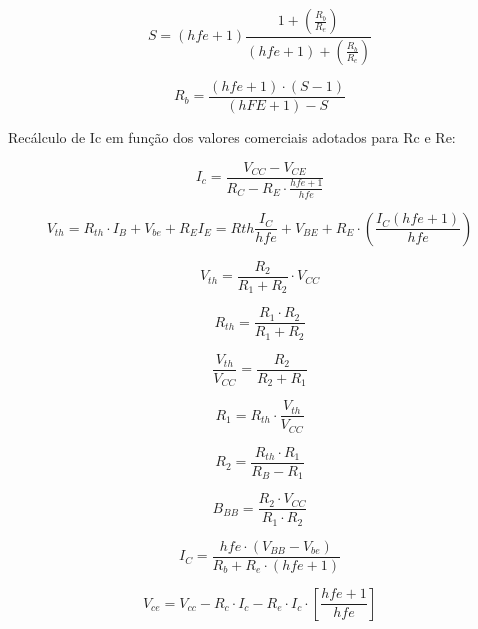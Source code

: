 \documentclass[openright]{normas-utf-tex} %
\begin{document}
\begin{equation}
S = \left(hfe + 1 \right)\frac{1 + \left( \frac{R_b}{R_e} \right)}{\left(hfe + 1 \right) + \left(\frac{R_b}{R_e} \right)}
\end{equation}

\begin{equation}
R_b = \frac{ \left(hfe + 1 \right) \cdot \left( S - 1 \right)}
{(hFE + 1 ) - S}
\end{equation}

Recálculo de Ic em função dos valores comerciais adotados para Rc e Re:

\begin{equation}
I_c = \frac{V_{CC} - V_{CE}}{R_C-R_E \cdot \frac{hfe+1}{hfe}}
\end{equation}

\begin{equation}
V_{th} = R_{th} \cdot I_B + V_{be} + R_E I_E = R{th} \frac{I_C}{hfe} + V_{BE} + R_E \cdot\left(\frac{I_C\left(hfe+1\right)}{hfe}\right)
\end{equation}

\begin{equation}
V_{th} = \frac{R_2}{R_1+R_2} \cdot V_{CC}
\end{equation}

\begin{equation}
R_{th} = \frac{R_1\cdot R_2}{R_1 + R_2}
\end{equation}

\begin{equation}
\frac{V_{th}} {V_{CC}} = \frac{R_2}{R_2+R_1}
\end{equation}

\begin{equation}
R_1 = R_{th} \cdot \frac{V_{th}} {V_{CC}}
\end{equation}

\begin{equation}
R_2 = \frac{R_{th} \cdot R_1}{ R_B - R_1}
\end{equation}

\begin{equation}
B_{BB}  = \frac{R_2 \cdot V_{CC}}{ R_1 \cdot R_2}
\end{equation}

\begin{equation}
I_C = \frac{hfe \cdot \left(V_{BB} - V_{be}\right)}{R_b + R_e \cdot \left(hfe+1\right)}
\end{equation}

\begin{equation}
V_{ce} = V_{cc} - R_c \cdot I_c - R_e \cdot I_c \cdot \left[ \frac{hfe +1 }{hfe} \right]
\end{equation}
\end{document}
